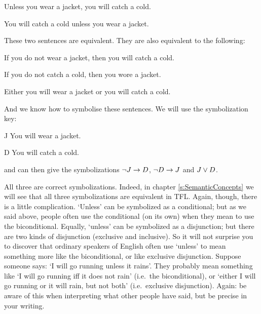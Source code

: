 \begin{earg}
\item[\ex{unless1}] Unless you wear a jacket, you will catch a cold. 
\item[\ex{unless2}] You will catch a cold unless you wear a jacket. 
\end{earg}
These two sentences are equivalent. They are also equivalent to the following: 
\begin{earg}
\item[\ex{unless3}]  If you do not wear a jacket, then you will catch a cold.
\item[\ex{unless4}]  If you do not catch a cold, then you wore a jacket.
\item [\ex{unless5}] Either you will wear a jacket or you will catch a cold.
\end{earg} 
And we know how to symbolise these sentences. We will use the symbolization key:
	\begin{ekey}
		\item[J] You will wear a jacket.
		\item[D] You will catch a cold.
	\end{ekey} and can then give the symbolizations $\neg J \rightarrow D$, $\neg D \rightarrow J$ and $J \vee D$.

All three are correct symbolizations. Indeed, in chapter \ref{s:SemanticConcepts} we will see that all three symbolizations are equivalent in TFL.
Again, though, there is a little complication. `Unless' can be symbolized as a conditional; but as we said above, people often use the conditional (on its own) when they mean to use the biconditional. Equally, `unless' can be symbolized as a disjunction; but there are two kinds of disjunction (exclusive and inclusive). So it will not surprise you to discover that ordinary speakers of English often use `unless' to mean something more like the biconditional, or like exclusive disjunction. Suppose someone says: `I will go running unless it rains'. They probably mean something like `I will go running iff it does not rain' (i.e.\ the biconditional), or  `either I will go running or it will rain, but not both' (i.e.\ exclusive disjunction). Again: be aware of this when interpreting what other people have said, but be precise in your writing.

